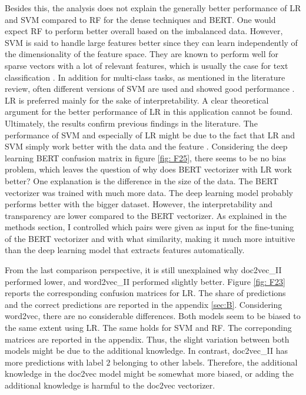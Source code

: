\documentclass[12pt, a4paper, titlepage]{article}
\begin{document}
Besides this, the analysis does not explain the generally better performance of \ac{LR} and \ac{SVM} compared to \ac{RF} for the dense techniques and \ac{BERT}. One would expect \ac{RF} to perform better overall based on the imbalanced data. However, \ac{SVM} is said to handle large features better since they can learn independently of the dimensionality of the feature space. They are known to perform well for sparse vectors with a lot of relevant features, which is usually the case for text classification \citep{Joachims1998}. In addition for multi-class tasks, as mentioned in the literature review, often different versions of \ac{SVM} are used and showed good performance \citep{Aiolli2005, Angulo2003,Benabdeslem2006, guo2015, Mayoraz1999,Tang2019,tomar2015comparison}. \ac{LR} is preferred mainly for the sake of interpretability. A clear theoretical argument for the better performance of \ac{LR} in this application cannot be found. Ultimately, the results confirm previous findings in the literature. The performance of \ac{SVM} and especially of \ac{LR} might be due to the fact that \ac{LR} and \ac{SVM} simply work better with the data and the feature \citep{maglogiannis2007}. Considering the deep learning \ac{BERT} confusion matrix in figure \ref{fig: F25}, there seems to be no bias problem, which leaves the question of why does \ac{BERT} vectorizer with \ac{LR} work better? One explanation is the difference in the size of the data. The \ac{BERT} vectorizer was trained with much more data. The deep learning model probably performs better with the bigger dataset. However, the interpretability and transparency are lower compared to the \ac{BERT} vectorizer. As explained in the methods section, I controlled which pairs were given as input for the fine-tuning of the \ac{BERT} vectorizer and with what similarity, making it much more intuitive than the deep learning model that extracts features automatically. 

From the last comparison perspective, it is still unexplained why doc2vec\_II performed lower, and word2vec\_II performed slightly better. Figure \ref{fig: F23} reports the corresponding confusion matrices for \ac{LR}. The share of predictions and the correct predictions are reported in the appendix \ref{sec:B}. Considering word2vec, there are no considerable differences. Both models seem to be biased to the same extent using \ac{LR}. The same holds for \ac{SVM} and \ac{RF}. The correponding matrices are reported in the appendix. Thus, the slight variation between both models might be due to the additional knowledge. In contrast, doc2vec\_II has more predictions with label $2$ belonging to other labels. Therefore, the additional knowledge in the doc2vec model might be somewhat more biased, or adding the additional knowledge is harmful to the doc2vec vectorizer. 
\end{document}
